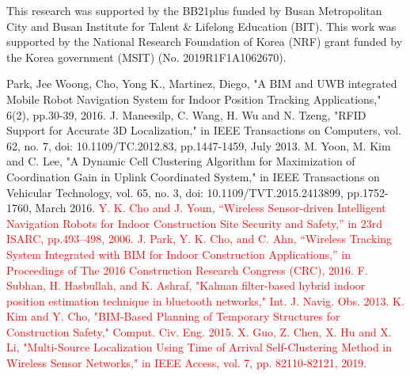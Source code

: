 \documentclass[conference]{IEEEtran}
\begin{document}
This research was supported by the BB21plus funded by Busan Metropolitan City and Busan Institute for Talent \& Lifelong Education (BIT).
This work was supported by the National Research Foundation of Korea (NRF) grant funded by the Korea government (MSIT) (No. 2019R1F1A1062670).

\begin{thebibliography}{00}
     Park, Jee Woong, Cho, Yong K., Martinez, Diego, "A BIM and UWB integrated Mobile Robot Navigation System for Indoor Position Tracking Applications," 6(2), pp.30-39, 2016.
     J. Maneesilp, C. Wang, H. Wu and N. Tzeng, "RFID Support for Accurate 3D Localization," in IEEE Transactions on Computers, vol. 62, no. 7, doi: 10.1109/TC.2012.83, pp.1447-1459, July 2013.
     M. Yoon, M. Kim and C. Lee, "A Dynamic Cell Clustering Algorithm for Maximization of Coordination Gain in Uplink Coordinated System," in IEEE Transactions on Vehicular Technology, vol. 65, no. 3, doi: 10.1109/TVT.2015.2413899, pp.1752-1760, March 2016.
    \textcolor{red}{
     Y. K. Cho and J. Youn, “Wireless Sensor-driven Intelligent Navigation Robots for Indoor Construction Site Security and Safety,” in 23rd ISARC, pp.493–498, 2006.
     J. Park, Y. K. Cho, and C. Ahn, “Wireless Tracking System Integrated with BIM for Indoor Construction Applications,” in Proceedings of The 2016 Construction Research Congress (CRC), 2016.
     F. Subhan, H. Hasbullah, and K. Ashraf, "Kalman filter-based hybrid indoor position estimation technique in bluetooth networks," Int. J. Navig. Obs. 2013.
     K. Kim and Y. Cho, "BIM-Based Planning of Temporary Structures for Construction Safety," Comput. Civ. Eng. 2015.
     X. Guo, Z. Chen, X. Hu and X. Li, "Multi-Source Localization Using Time of Arrival Self-Clustering Method in Wireless Sensor Networks," in IEEE Access, vol. 7, pp. 82110-82121, 2019.
    }
\end{thebibliography}
\end{document}
